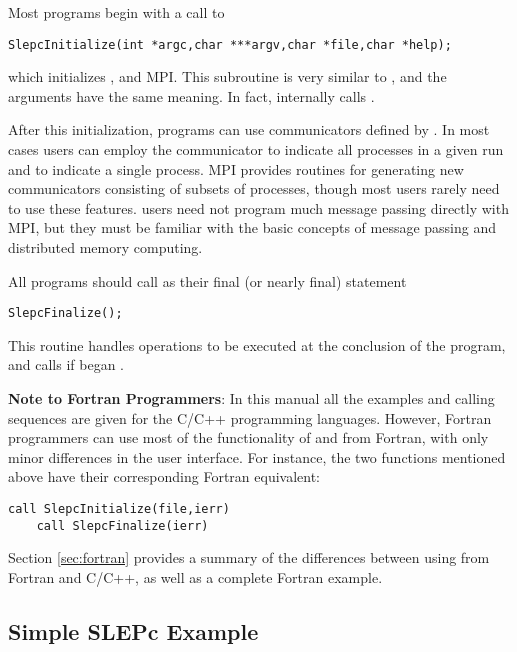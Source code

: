 	Most \slepc programs begin with a call to 
	\begin{Verbatim}[fontsize=\small]
	SlepcInitialize(int *argc,char ***argv,char *file,char *help);
	\end{Verbatim}
which initializes \slepc, \petsc and MPI. This subroutine is very similar to , and the arguments have the same meaning. In fact, internally  calls .

	After this initialization, \slepc programs can use communicators defined by \petsc. In most cases users can employ the communicator  to indicate all processes in a given run and  to indicate a single process. MPI provides routines for generating new communicators consisting of subsets of processes, though most users rarely need to use these features. \slepc users need not program much message passing directly with MPI, but they must be familiar with the basic concepts of message passing and distributed memory computing.

	All \slepc programs should call  as their final (or nearly final) statement
	\begin{Verbatim}[fontsize=\small]
	SlepcFinalize();
	\end{Verbatim}
This routine handles operations to be executed at the conclusion of the program, and calls  if  began \petsc.

\medskip
\textbf{Note to Fortran Programmers}: In this manual all the examples and calling sequences are given for the C/C++ programming languages. However, Fortran programmers can use most of the functionality of \slepc and \petsc from Fortran, with only minor differences in the user interface. For instance, the two functions mentioned above have their corresponding Fortran equivalent:
	\begin{Verbatim}[fontsize=\small]
	call SlepcInitialize(file,ierr)
	call SlepcFinalize(ierr)
	\end{Verbatim}
Section \ref{sec:fortran} provides a summary of the differences between using \slepc from Fortran and C/C++, as well as a complete Fortran example.

\subsection{Simple SLEPc Example}
\label{sec:simpleex}

